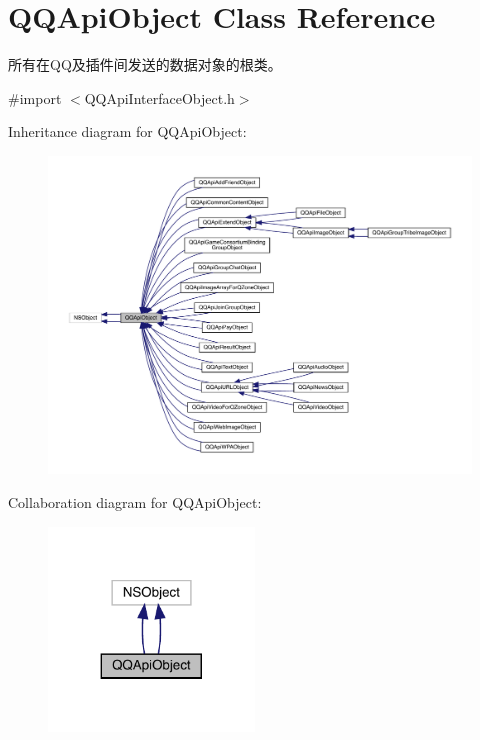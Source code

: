 \hypertarget{interface_q_q_api_object}{}\section{Q\+Q\+Api\+Object Class Reference}
\label{interface_q_q_api_object}


所有在\+Q\+Q及插件间发送的数据对象的根类。  




{\ttfamily \#import $<$Q\+Q\+Api\+Interface\+Object.\+h$>$}



Inheritance diagram for Q\+Q\+Api\+Object\+:\nopagebreak
\begin{figure}[H]
\begin{center}
\leavevmode
\includegraphics[width=350pt]{interface_q_q_api_object__inherit__graph}
\end{center}
\end{figure}


Collaboration diagram for Q\+Q\+Api\+Object\+:\nopagebreak
\begin{figure}[H]
\begin{center}
\leavevmode
\includegraphics[width=155pt]{interface_q_q_api_object__coll__graph}
\end{center}
\end{figure}
